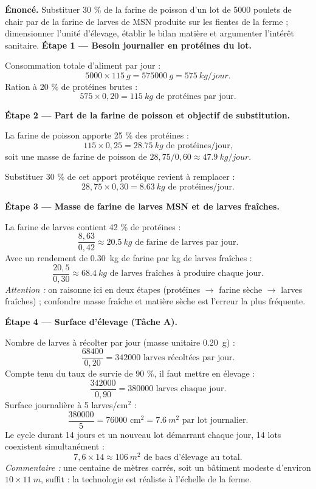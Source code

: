 \documentclass[11pt]{article}
\begin{document}
\begin{exoresolu}
\textbf{Énoncé.} Substituer 30 \% de la farine de poisson d'un lot de \num{5000} poulets de chair par de la farine de larves de MSN produite sur les fientes de la ferme ; dimensionner l'unité d'élevage, établir le bilan matière et argumenter l'intérêt sanitaire.
\tcblower
\textbf{Étape 1 — Besoin journalier en protéines du lot.}

Consommation totale d'aliment par jour :
\[ \num{5000} \times \SI{115}{g} = \SI{575000}{g} = \SI{575}{kg/jour}. \]
Ration à 20 \% de protéines brutes :
\[ 575 \times 0{,}20 = \SI{115}{kg} \text{ de protéines par jour.} \]

\textbf{Étape 2 — Part de la farine de poisson et objectif de substitution.}

La farine de poisson apporte 25 \% des protéines :
\[ 115 \times 0{,}25 = \SI{28,75}{kg} \text{ de protéines/jour,} \]
soit une masse de farine de poisson de $28{,}75 / 0{,}60 \approx \SI{47,9}{kg/jour}$.

Substituer 30 \% de cet apport protéique revient à remplacer :
\[ 28{,}75 \times 0{,}30 = \SI{8,63}{kg} \text{ de protéines/jour.} \]

\textbf{Étape 3 — Masse de farine de larves MSN et de larves fraîches.}

La farine de larves contient 42 \% de protéines :
\[ \frac{8{,}63}{0{,}42} \approx \SI{20,5}{kg} \text{ de farine de larves par jour.} \]
Avec un rendement de \SI{0,30}{kg} de farine par kg de larves fraîches :
\[ \frac{20{,}5}{0{,}30} \approx \SI{68,4}{kg} \text{ de larves fraîches à produire chaque jour.} \]
\emph{Attention :} on raisonne ici en deux étapes (protéines $\rightarrow$ farine sèche $\rightarrow$ larves fraîches) ; confondre masse fraîche et matière sèche est l'erreur la plus fréquente.

\textbf{Étape 4 — Surface d'élevage (Tâche A).}

Nombre de larves à récolter par jour (masse unitaire \SI{0,20}{g}) :
\[ \frac{\num{68400}}{0{,}20} = \num{342000} \text{ larves récoltées par jour.} \]
Compte tenu du taux de survie de 90 \%, il faut mettre en élevage :
\[ \frac{\num{342000}}{0{,}90} = \num{380000} \text{ larves chaque jour.} \]
Surface journalière à 5 larves/cm$^2$ :
\[ \frac{\num{380000}}{5} = \num{76000} \text{ cm}^2 = \SI{7,6}{m^2} \text{ par lot journalier.} \]
Le cycle durant 14 jours et un nouveau lot démarrant chaque jour, 14 lots coexistent simultanément :
\[ 7{,}6 \times 14 \approx \SI{106}{m^2} \text{ de bacs d'élevage au total.} \]
\emph{Commentaire :} une centaine de mètres carrés, soit un bâtiment modeste d'environ $10 \times \SI{11}{m}$, suffit : la technologie est réaliste à l'échelle de la ferme.


\end{exoresolu}
\end{document}
